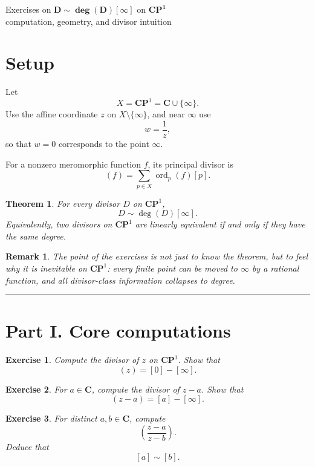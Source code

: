 \documentclass[11pt]{article}
\newtheorem{theorem}{Theorem}
\newtheorem{exercise}{Exercise}
\newtheorem*{remark}{Remark}
\newcommand{\CP}{\mathbf{CP}^1}
\newcommand{\C}{\mathbf{C}}
\newcommand{\ord}{\operatorname{ord}}
\begin{document}
	
	\begin{center}
		{\LARGE Exercises on \(\boldsymbol{D \sim \deg(D)[\infty]}\) on \(\boldsymbol{\CP}\)}\\[0.5em]
		{\large computation, geometry, and divisor intuition}
	\end{center}
	
	\bigskip
	
	\section*{Setup}
	
	Let
	\[
	X=\CP=\C\cup\{\infty\}.
	\]
	Use the affine coordinate \(z\) on \(X\setminus\{\infty\}\), and near \(\infty\) use
	\[
	w=\frac{1}{z},
	\]
	so that \(w=0\) corresponds to the point \(\infty\).
	
	For a nonzero meromorphic function \(f\), its principal divisor is
	\[
	(f)=\sum_{p\in X}\ord_p(f)[p].
	\]
	
	\bigskip
	
	\begin{theorem}
		For every divisor \(D\) on \(\CP\),
		\[
		D \sim \deg(D)[\infty].
		\]
		Equivalently, two divisors on \(\CP\) are linearly equivalent if and only if they have the same degree.
	\end{theorem}
	
	\begin{remark}
		The point of the exercises is not just to know the theorem, but to feel why it is inevitable on \(\CP\): every finite point can be moved to \(\infty\) by a rational function, and all divisor-class information collapses to degree.
	\end{remark}
	
	\hrule
	\bigskip
	
	\section*{Part I. Core computations}
	
	\begin{exercise}
		Compute the divisor of \(z\) on \(\CP\). Show that
		\[
		(z)=[0]-[\infty].
		\]
	\end{exercise}
	
	\begin{exercise}
		For \(a\in\C\), compute the divisor of \(z-a\). Show that
		\[
		(z-a)=[a]-[\infty].
		\]
	\end{exercise}
	
	\begin{exercise}
		For distinct \(a,b\in\C\), compute
		\[
		\left(\frac{z-a}{z-b}\right).
		\]
		Deduce that
		\[
		[a]\sim [b].
		\]
	\end{exercise}
	
\end{document}
